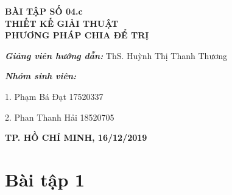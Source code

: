 \documentclass[12pt, a4paper, fleqn]{article}
\begin{document}
\begin{titlepage}
\begin{center}
			\vspace{1.5cm}
			
			\Large
			\textbf{BÀI TẬP SỐ 04.c\\THIẾT KẾ GIẢI THUẬT\\PHƯƠNG PHÁP CHIA ĐỂ TRỊ}
		
		\end{center}
			
			\vspace{2.5cm}
			\normalsize	
			
			\hspace{70pt} \textbf{\textit{Giảng viên hướng dẫn:}} ThS. Huỳnh Thị Thanh Thương\\
			
			\vspace*{1cm}
			
			\hspace{70pt} \textbf{\textit{Nhóm sinh viên:}}
			
			\vspace*{0.2cm}
			
			\hspace{70pt} 1. \hspace{10pt} Phạm Bá Đạt \hspace{60pt} 17520337
			
			\vspace*{0.2cm}
			\hspace{70pt} 2. \hspace{10pt} Phan Thanh Hải  \hspace{45pt} 18520705
			
			\vspace{4cm}
		
		\begin{center}
			\textbf{TP. HỒ CHÍ MINH, 16/12/2019}
		\end{center}
			
	\end{titlepage}

	\begin{center}
		\tableofcontents
	\end{center}
	\clearpage
	
	\setlength{\abovedisplayskip}{5pt}
	\setlength{\belowdisplayskip}{5pt}
	
	
	\section*{Bài tập 1}
	
\end{document}
